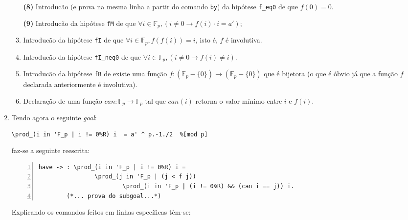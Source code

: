 \begin{enumerate}[label=\textbf{\roman*.}]
\begin{enumerate}
                \item[\textbf{(8)}] Introducão (e prova na mesma linha a partir do comando \lstinline[language=coq]|by|) da hipótese \lstinline[language=coq]|f_eq0| de que $f(0) = 0$.
                
                \item[\textbf{(9)}] Introducão da hipótese \lstinline[language=coq]|fM| de que $\forall i \in \mathbb{F}_p, (i \neq 0 \rightarrow f(i) \cdot i = a')$;
                
                \item[\textbf{(11)}] Introducão da hipótese \lstinline[language=coq]|fI| de que $\forall i \in \mathbb{F}_p, f(f(i)) = i$, isto é, $f$ é involutiva.
                
                \item[\textbf{(13)}] Introducão da hipótese \lstinline[language=coq]|fI_neq0| de que $\forall i \in \mathbb{F}_p, (i \neq 0 \rightarrow f(i) \neq i)$.
                
                \item[\textbf{(15)}] Introducão da hipótese \lstinline[language=coq]|fB| de existe uma função $f : (\mathbb{F}_p - \{0\}) \rightarrow (\mathbb{F}_p - \{0\})$ que é bijetora (o que é óbvio já que a função $f$ declarada anteriormente é involutiva).
                
                \item[\textbf{(17)}] Declaração de uma função $can : \mathbb{F}_p \rightarrow \mathbb{F}_p$ tal que $can(i)$ retorna o valor mínimo entre $i$ e $f(i)$.
        \end{enumerate}

        \item Tendo agora o seguinte \textit{goal}:
                \begin{lstlisting}[language=coq,frame=single,tabsize=1]
\prod_(i in 'F_p | i != 0%R) i  = a' ^ p.-1./2  %[mod p]
                \end{lstlisting}
        faz-se a seguinte reescrita:
                \begin{lstlisting}[language=coq,frame=single, numbers=left,stepnumber=1,tabsize=1]
have -> : \prod_(i in 'F_p | i != 0%R) i =
                \prod_(j in 'F_p | (j < f j))
                        \prod_(i in 'F_p | (i != 0%R) && (can i == j)) i.
        (*... prova do subgoal...*)
                \end{lstlisting}
        
        Explicando os comandos feitos em linhas específicas têm-se:
        \begin{enumerate}[listparindent=\parindent]


\end{enumerate}
\end{enumerate}
